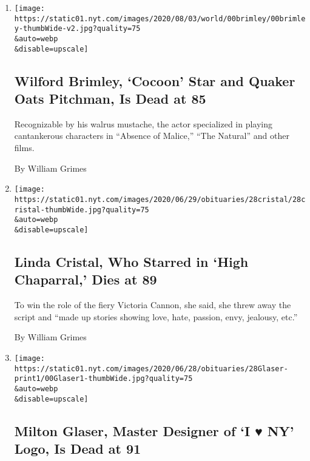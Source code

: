 \begin{enumerate}
\def\labelenumi{\arabic{enumi}.}
\item
  \href{/2020/08/01/obituaries/wilford-brimley-dead.html}{}

  \texttt{[image: https://static01.nyt.com/images/2020/08/03/world/00brimley/00brimley-thumbWide-v2.jpg?quality=75\\\&auto=webp\\\&disable=upscale]}

  \hypertarget{wilford-brimley-cocoon-star-and-quaker-oats-pitchman-is-dead-at-85}{%
  \subsection{Wilford Brimley, `Cocoon' Star and Quaker Oats Pitchman,
  Is Dead at
  85}\label{wilford-brimley-cocoon-star-and-quaker-oats-pitchman-is-dead-at-85}}

  Recognizable by his walrus mustache, the actor specialized in playing
  cantankerous characters in ``Absence of Malice,'' ``The Natural'' and
  other films.

  By William Grimes
\item
  \href{/2020/06/28/obituaries/linda-cristal-dead.html}{}

  \texttt{[image: https://static01.nyt.com/images/2020/06/29/obituaries/28cristal/28cristal-thumbWide.jpg?quality=75\\\&auto=webp\\\&disable=upscale]}

  \hypertarget{linda-cristal-who-starred-in-high-chaparral-dies-at-89}{%
  \subsection{Linda Cristal, Who Starred in `High Chaparral,' Dies at
  89}\label{linda-cristal-who-starred-in-high-chaparral-dies-at-89}}

  To win the role of the fiery Victoria Cannon, she said, she threw away
  the script and ``made up stories showing love, hate, passion, envy,
  jealousy, etc.''

  By William Grimes
\item
  \href{/2020/06/26/obituaries/milton-glaser-dead.html}{}

  \texttt{[image: https://static01.nyt.com/images/2020/06/28/obituaries/28Glaser-print1/00Glaser1-thumbWide.jpg?quality=75\\\&auto=webp\\\&disable=upscale]}

  \hypertarget{milton-glaser-master-designer-of-i--ny-logo-is-dead-at-91}{%
  \subsection{Milton Glaser, Master Designer of `I ♥ NY' Logo, Is Dead
  at
  91}\label{milton-glaser-master-designer-of-i--ny-logo-is-dead-at-91}}


\end{enumerate}
